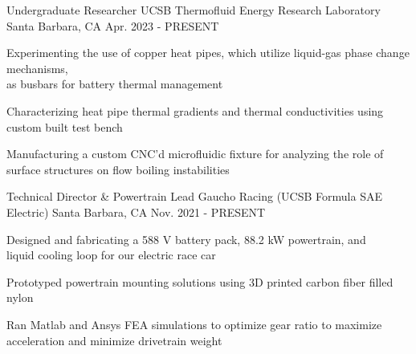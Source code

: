 

\begin{cventries}

\cventry
{Undergraduate Researcher} %
{UCSB Thermofluid Energy Research Laboratory} %
{Santa Barbara, CA} %
{Apr. 2023 - PRESENT} %
{ %
\begin{cvitems}   
\item {Experimenting the use of copper heat pipes, which utilize liquid-gas phase change mechanisms,\\ as busbars for battery thermal management}
\item {Characterizing heat pipe thermal gradients and thermal conductivities using custom built test bench}
\item {Manufacturing a custom CNC'd microfluidic fixture for analyzing the role of surface structures on flow boiling instabilities}
\end{cvitems}
}

\cventry
{Technical Director \& Powertrain Lead} %
{Gaucho Racing (UCSB Formula SAE Electric)} %
{Santa Barbara, CA} %
{Nov. 2021 - PRESENT} %
{ %
\begin{cvitems}   
\item {Designed and fabricating a 588 V battery pack, 88.2 kW powertrain, and \\ liquid cooling loop for our electric race car}
\item {Prototyped powertrain mounting solutions using 3D printed carbon fiber filled nylon}
\item {Ran Matlab and Ansys FEA simulations to optimize gear ratio to maximize acceleration and minimize drivetrain weight}
\end{cvitems}
}



\end{cventries}
